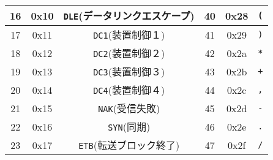 \begin{center}
\begin{tabular}{|c|c|c||c|c|c|}
16&0x10&\verb|DLE|(データリンクエスケープ)&40&0x28&\verb|(|\\ \hline
17&0x11&\verb|DC1|(装置制御１)&41&0x29&\verb|)|\\ \hline
18&0x12&\verb|DC2|(装置制御２)&42&0x2a&\verb|*|\\ \hline
19&0x13&\verb|DC3|(装置制御３)&43&0x2b&\verb|+|\\ \hline
20&0x14&\verb|DC4|(装置制御４)&44&0x2c&\verb|,|\\ \hline
21&0x15&\verb|NAK|(受信失敗)&45&0x2d&\verb|-|\\ \hline
22&0x16&\verb|SYN|(同期)&46&0x2e&\verb|.|\\ \hline
23&0x17&\verb|ETB|(転送ブロック終了)&47&0x2f&\verb|/|\\ \hline
\end{tabular}


\end{center}
